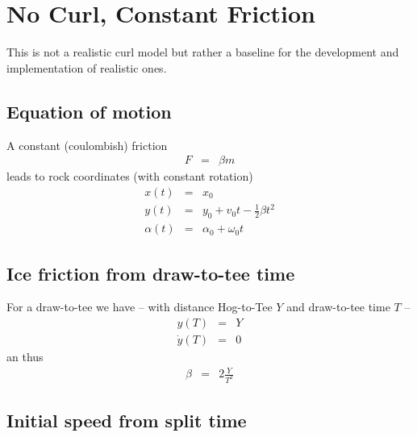 \section{No Curl, Constant Friction}
This is not a realistic curl model but rather a baseline for the development and
implementation of realistic ones.
\subsection{Equation of motion}
A constant (coulombish) friction 
\begin{eqnarray}
F &=& \beta m
\end{eqnarray}
leads to rock coordinates (with constant rotation)
\begin{eqnarray}
x(t) &=& x_0 \\
y(t) &=& y_0 + v_0t - \frac{1}{2}\beta t^2 \\
\alpha(t) &=& \alpha_0 + \omega_0 t
\end{eqnarray}

\subsection{Ice friction from draw-to-tee time}
For a draw-to-tee we have -- with distance Hog-to-Tee $Y$ and draw-to-tee time 
$T$ --
\begin{eqnarray}
y(T) &=& Y \\
\dot y(T) &=& 0
\end{eqnarray}
an thus
\begin{eqnarray}
\beta &=& 2 \frac {Y}{T^2}
\end{eqnarray}

\subsection{Initial speed from split time}
